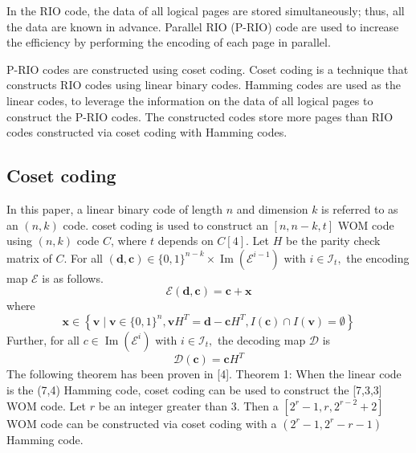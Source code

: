 \documentclass{article}
\begin{document}
In the RIO code, the data of all logical pages are stored simultaneously; thus, all the data are known in advance. Parallel RIO (P-RIO) code are used to increase the efficiency by performing the  encoding of each page in parallel.

P-RIO codes are constructed using coset coding. Coset coding is a technique that constructs RIO codes using linear binary codes. Hamming codes are used as the linear codes, to leverage the information on the data of all logical pages to construct the P-RIO codes. The constructed codes store more pages than RIO codes constructed via coset coding with Hamming codes. 

\subsection{Coset coding}
In this paper, a linear binary code of length $n$ and dimension $k$ is referred to as an $(n, k)$ code. coset coding is used to construct an $[n, n-k, t]$ WOM code using $(n, k)$ code $C$, where $t$ depends on $C[4] .$ Let $H$ be the parity check matrix of $C .$ For all $(\boldsymbol{d}, \boldsymbol{c}) \in\{0,1\}^{n-k} \times \operatorname{Im}\left(\mathcal{E}^{i-1}\right)$ with $i \in \mathcal{I}_{t},$ the
encoding map $\mathcal{E}$ is as follows.
$$
\mathcal{E}(\boldsymbol{d}, \boldsymbol{c})=\boldsymbol{c}+\boldsymbol{x}
$$
where
$$
\boldsymbol{x} \in\left\{\boldsymbol{v} \mid \boldsymbol{v} \in\{0,1\}^{n}, \boldsymbol{v} H^{T}=\boldsymbol{d}-\boldsymbol{c} H^{T}, I(\boldsymbol{c}) \cap I(\boldsymbol{v})=\emptyset\right\}
$$
Further, for all $c \in \operatorname{Im}\left(\mathcal{E}^{i}\right)$ with $i \in \mathcal{I}_{t},$ the decoding map $\mathcal{D}$ is
$$
\mathcal{D}(\boldsymbol{c})=\boldsymbol{c} H^{T}
$$
The following theorem has been proven in [4]. Theorem 1: When the linear code is the (7,4) Hamming code, coset coding can be used to construct the [7,3,3] WOM code. Let $r$ be an integer greater than $3 .$ Then a $\left[2^{r}-1, r, 2^{r-2}+2\right]$ WOM code can be constructed via coset coding with a $\left(2^{r}-1,2^{r}-r-1\right)$ Hamming code.
\end{document}
